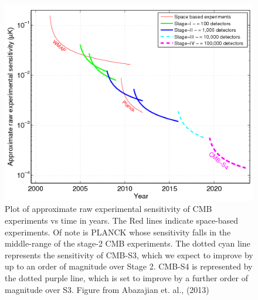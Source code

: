 \begin{figure}[t]
\centering
\includegraphics[scale=0.75]{images/experiments.png} 
\caption{Plot of approximate raw experimental sensitivity of CMB experiments vs time in years. The Red lines indicate space-based experiments. Of note is PLANCK whose sensitivity falls in the middle-range of the stage-2 CMB experiments. The dotted cyan line represents the sensitivity of CMB-S3, which we expect to improve by up to an order of magnitude over Stage 2. CMB-S4 is represented by the dotted purple line, which is set to improve by a further order of magnitude over S3. Figure from Abazajian et. al., (2013) \cite{Abazajian:2013oma}}
\end{figure}

